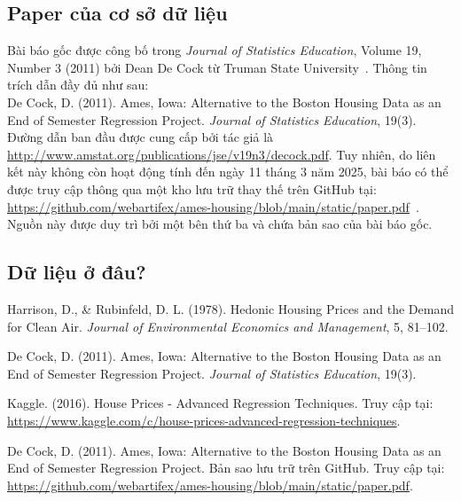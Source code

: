 \documentclass{article}
\begin{document}
\subsection{Paper của cơ sở dữ liệu}
Bài báo gốc được công bố trong \textit{Journal of Statistics Education}, Volume 19, Number 3 (2011) bởi Dean De Cock từ Truman State University~\cite{decock2011}. Thông tin trích dẫn đầy đủ như sau: \\
De Cock, D. (2011). Ames, Iowa: Alternative to the Boston Housing Data as an End of Semester Regression Project. \textit{Journal of Statistics Education}, 19(3). \\
Đường dẫn ban đầu được cung cấp bởi tác giả là \url{http://www.amstat.org/publications/jse/v19n3/decock.pdf}. Tuy nhiên, do liên kết này không còn hoạt động tính đến ngày 11 tháng 3 năm 2025, bài báo có thể được truy cập thông qua một kho lưu trữ thay thế trên GitHub tại: \url{https://github.com/webartifex/ames-housing/blob/main/static/paper.pdf}~\cite{github2025}. Nguồn này được duy trì bởi một bên thứ ba và chứa bản sao của bài báo gốc.

\subsection{Dữ liệu ở đâu?}

\begin{thebibliography}{9}

Harrison, D., \& Rubinfeld, D. L. (1978). Hedonic Housing Prices and the Demand for Clean Air. \textit{Journal of Environmental Economics and Management}, 5, 81--102.

De Cock, D. (2011). Ames, Iowa: Alternative to the Boston Housing Data as an End of Semester Regression Project. \textit{Journal of Statistics Education}, 19(3).

Kaggle. (2016). House Prices - Advanced Regression Techniques. Truy cập tại: \url{https://www.kaggle.com/c/house-prices-advanced-regression-techniques}.

De Cock, D. (2011). Ames, Iowa: Alternative to the Boston Housing Data as an End of Semester Regression Project. Bản sao lưu trữ trên GitHub. Truy cập tại: \url{https://github.com/webartifex/ames-housing/blob/main/static/paper.pdf}.

\end{thebibliography}
\end{document}
